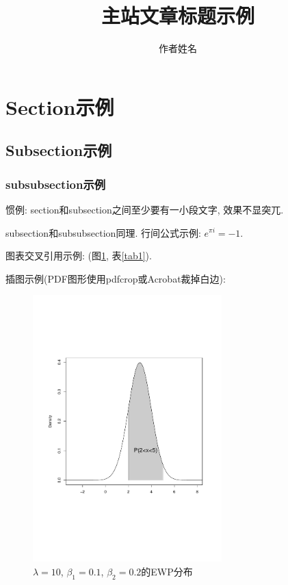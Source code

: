 \documentclass{cosart}
\begin{document}
\title{主站文章标题示例} %
\author{作者姓名} %
\maketitle

\section{Section示例}

\subsection{Subsection示例}

\subsubsection{subsubsection示例}

惯例: section和subsection之间至少要有一小段文字, 效果不显突兀.

subsection和subsubsection同理. 行间公式示例: $e^{\pi i}=-1$.

图表交叉引用示例: (图\ref{fig1}, 表\ref{tab1}).

插图示例(PDF图形使用pdfcrop或Acrobat裁掉白边):
\begin{figure}[htbp]
\centering
\includegraphics[width=0.65\textwidth]{figure.pdf}
\caption{$\lambda=10$, $\beta_1=0.1$, $\beta_2=0.2$的EWP分布} \label{fig1}
\end{figure}
\end{document}
